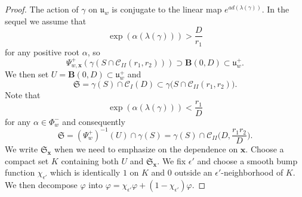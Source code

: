 \documentclass[12pt]{amsbook}%
\theoremstyle{definition}
\theoremstyle{remark}
\numberwithin{section}{chapter}
\numberwithin{subsection}{section}
\numberwithin{figure}{chapter}
\def\fS{{\mathfrak{S}}}
\def\fu{{\mathfrak{u}}}
\def\fuwp{{\mathfrak{u}_w^+}}
\def\Cyli{{\mathcal{C}_I}}
\def\Cylii{{\mathcal{C}_{II}}}
\def\bx{\mathbf{x}}
\def\la{\lambda}
\begin{document}
{{\begin{proof}
The action of $\gamma$ on $\fu_w$ is conjugate to the linear map $e^{ad(\la(\gamma))}$. In the sequel we assume that 
\[\exp(\alpha(\la(\gamma)))>\frac{D}{r_1}\]
for any positive root $\alpha$, so
\begin{equation}\label{eq:horizontal_big_ball}
\Psi_{w ,\bx}^+\left(\gamma\left(S\cap\Cylii(r_1,r_2)\right)\right)  \supset \mathbf{B}(0,D)\subset \fuwp.
\end{equation}
We then set $U=\mathbf{B}(0,D)\subset \fuwp$ and
\begin{equation*}
\fS=\gamma(S)\cap \Cyli(D)\subset \gamma\big(S\cap \Cylii(r_1,r_2)\big).
\end{equation*}
Note that 
\[\exp(\alpha(\la(\gamma)))<\frac{r_1}{D}\]
for any $\alpha\in \Phi_w^-$ and consequently
\[\fS=(\Psi_w^+)^{-1}(U)\cap \gamma(S)=\gamma(S)\cap\Cylii\big(D,\frac{r_1r_2}{D}\big).\] 
We write $\fS_\bx$ when we need to emphasize on the dependence on $\bx$. 
Choose a compact set $K$ containing both $U$ and $\fS_{\bx}$. 
We fix $\epsilon'$ and choose a smooth bump function $\chi_{\epsilon'}$ which is identically $1$ on  $K$ and $0$ outside an $\epsilon'$-neighborhood of $K$. We then decompose $\varphi$ into $\varphi = \chi_{\epsilon'} \varphi + (1 - \chi_{\epsilon'}) \varphi$.


\end{proof}}}
\end{document}
